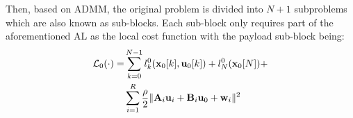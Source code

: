 Then, based on ADMM, the original problem is divided into $N+1$ subproblems which are also known as sub-blocks. Each sub-block only requires part of the aforementioned AL as the local cost function with the payload sub-block being:
\begin{equation}
    \begin{aligned}
        \mathcal{L}_0(\cdot) = & \sum_{k = 0}^{N-1}l_k^0(\mathbf{x}_{0}[k], \mathbf{u}_{0}[k]) + l_N^0(\mathbf{x}_{0}[N]) + \\
        & \sum_{i = 1}^{R} \frac{\rho}{2}\|\mathbf{A}_i \mathbf{u}_i+\mathbf{B}_i \mathbf{u}_0 + \mathbf{w}_i\|^2
    \end{aligned}
\end{equation}

